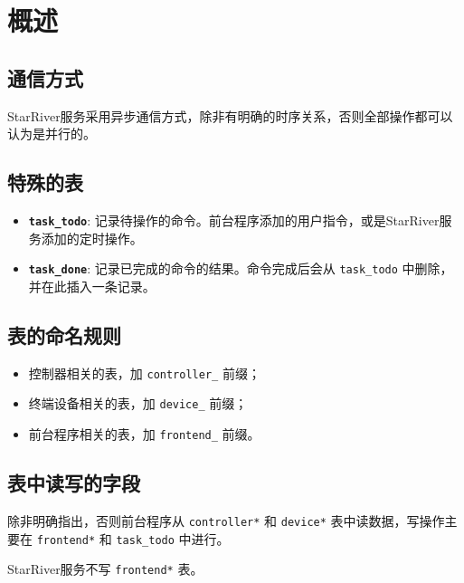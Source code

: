 \section{概述}\label{ux6982ux8ff0}

\subsection{通信方式}\label{ux901aux4fe1ux65b9ux5f0f}

StarRiver服务采用异步通信方式，除非有明确的时序关系，否则全部操作都可以认为是并行的。

\subsection{特殊的表}\label{ux7279ux6b8aux7684ux8868}

\begin{itemize}
\item
  \textbf{\texttt{task\_todo}}:
  记录待操作的命令。前台程序添加的用户指令，或是StarRiver服务添加的定时操作。
\item
  \textbf{\texttt{task\_done}}: 记录已完成的命令的结果。命令完成后会从
  \texttt{task\_todo} 中删除，并在此插入一条记录。
\end{itemize}

\subsection{表的命名规则}\label{ux8868ux7684ux547dux540dux89c4ux5219}

\begin{itemize}
\itemsep1pt\parskip0pt
\item
  控制器相关的表，加 \texttt{controller\_} 前缀；
\item
  终端设备相关的表，加 \texttt{device\_} 前缀；
\item
  前台程序相关的表，加 \texttt{frontend\_} 前缀。
\end{itemize}

\subsection{表中读写的字段}\label{ux8868ux4e2dux8bfbux5199ux7684ux5b57ux6bb5}

除非明确指出，否则前台程序从 \texttt{controller*} 和 \texttt{device*}
表中读数据，写操作主要在 \texttt{frontend*} 和 \texttt{task\_todo}
中进行。

StarRiver服务不写 \texttt{frontend*} 表。

